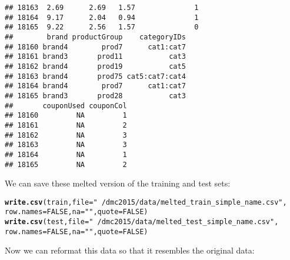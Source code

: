 \documentclass[10pt]{report}
\makeatletter
\newcommand{\hlnum}[1]{\textcolor[rgb]{0.686,0.059,0.569}{#1}}%
\newcommand{\hlstr}[1]{\textcolor[rgb]{0.192,0.494,0.8}{#1}}%
\newcommand{\hlstd}[1]{\textcolor[rgb]{0.345,0.345,0.345}{#1}}%
\newcommand{\hlkwc}[1]{\textcolor[rgb]{0.333,0.667,0.333}{#1}}%
\newcommand{\hlkwd}[1]{\textcolor[rgb]{0.737,0.353,0.396}{\textbf{#1}}}%
\newenvironment{kframe}{%
 \def\at@end@of@kframe{}%
 \ifinner\ifhmode%
  \def\at@end@of@kframe{\end{minipage}}%
  \begin{minipage}{\columnwidth}%
 \fi\fi%
 \def\FrameCommand##1{\hskip\@totalleftmargin \hskip-\fboxsep
 \colorbox{shadecolor}{##1}\hskip-\fboxsep
     \hskip-\linewidth \hskip-\@totalleftmargin \hskip\columnwidth}%
 \MakeFramed {\advance\hsize-\width
   \@totalleftmargin\z@ \linewidth\hsize
   \@setminipage}}%
 {\par\unskip\endMakeFramed%
 \at@end@of@kframe}
\newenvironment{knitrout}{}{} %
\makeatother
\begin{document}
\begin{knitrout}
\begin{kframe}
\begin{verbatim}
## 18163  2.69      2.69   1.57              1
## 18164  9.17      2.04   0.94              1
## 18165  9.22      2.56   1.57              0
##        brand productGroup    categoryIDs
## 18160 brand4        prod7      cat1:cat7
## 18161 brand3       prod11           cat3
## 18162 brand4       prod19           cat5
## 18163 brand4       prod75 cat5:cat7:cat4
## 18164 brand4        prod7      cat1:cat7
## 18165 brand3       prod28           cat3
##       couponUsed couponCol
## 18160         NA         1
## 18161         NA         2
## 18162         NA         3
## 18163         NA         3
## 18164         NA         1
## 18165         NA         2
\end{verbatim}
\end{kframe}
\end{knitrout}
We can save these melted version of the training and test sets:
\begin{knitrout}
\color{fgcolor}\begin{kframe}
\begin{alltt}
\hlkwd{write.csv}\hlstd{(train,} \hlkwc{file} \hlstd{=} \hlstr{"~/dmc2015/data/melted_train_simple_name.csv"}\hlstd{,}
    \hlkwc{row.names} \hlstd{=} \hlnum{FALSE}\hlstd{,} \hlkwc{na} \hlstd{=} \hlstr{""}\hlstd{,} \hlkwc{quote} \hlstd{=} \hlnum{FALSE}\hlstd{)}
\hlkwd{write.csv}\hlstd{(test,} \hlkwc{file} \hlstd{=} \hlstr{"~/dmc2015/data/melted_test_simple_name.csv"}\hlstd{,}
    \hlkwc{row.names} \hlstd{=} \hlnum{FALSE}\hlstd{,} \hlkwc{na} \hlstd{=} \hlstr{""}\hlstd{,} \hlkwc{quote} \hlstd{=} \hlnum{FALSE}\hlstd{)}
\end{alltt}
\end{kframe}
\end{knitrout}
Now we can reformat this data so that it resembles the original data:
\end{document}
